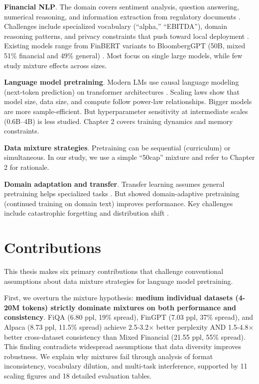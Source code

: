 \textbf{Financial NLP}. The domain covers sentiment analysis, question answering, numerical reasoning, and information extraction from regulatory documents \parencite{araci2019finbert, chen2021finqa}. Challenges include specialized vocabulary (``alpha,'' ``EBITDA''), domain reasoning patterns, and privacy constraints that push toward local deployment \parencite{wu2023bloomberggpt}. Existing models range from FinBERT variants \parencite{araci2019finbert, yang2020finbert} to BloombergGPT (50B, mixed 51\% financial and 49\% general) \parencite{wu2023bloomberggpt}. Most focus on single large models, while few study mixture effects across sizes.

\textbf{Language model pretraining}. Modern LMs use causal language modeling (next-token prediction) on transformer architectures \parencite{vaswani2017attention, radford2019language, brown2020language}. Scaling laws \parencite{kaplan2020scaling, hoffmann2022training} show that model size, data size, and compute follow power-law relationships. Bigger models are more sample-efficient. But hyperparameter sensitivity at intermediate scales (0.6B–4B) is less studied. Chapter 2 covers training dynamics and memory constraints.

\textbf{Data mixture strategies}. Pretraining can be sequential (curriculum) or simultaneous. In our study, we use a simple “50cap” mixture and refer to Chapter 2 for rationale.

\textbf{Domain adaptation and transfer}. Transfer learning assumes general pretraining helps specialized tasks \parencite{devlin2019bert, pan2010transfer}. But \textcite{gururangan2020don} showed domain-adaptive pretraining (continued training on domain text) improves performance. Key challenges include catastrophic forgetting \parencite{kirkpatrick2017overcoming} and distribution shift \parencite{quinonero2009dataset}. 

\section{Contributions}

This thesis makes six primary contributions that challenge conventional assumptions about data mixture strategies for language model pretraining.

First, we overturn the mixture hypothesis: \textbf{medium individual datasets (4-20M tokens) strictly dominate mixtures on both performance and consistency}. FiQA (6.80 ppl, 19\% spread), FinGPT (7.03 ppl, 37\% spread), and Alpaca (8.73 ppl, 11.5\% spread) achieve 2.5-3.2$\times$ better perplexity AND 1.5-4.8$\times$ better cross-dataset consistency than Mixed Financial (21.55 ppl, 55\% spread). This finding contradicts widespread assumptions that data diversity improves robustness. We explain why mixtures fail through analysis of format inconsistency, vocabulary dilution, and multi-task interference, supported by 11 scaling figures and 18 detailed evaluation tables.

